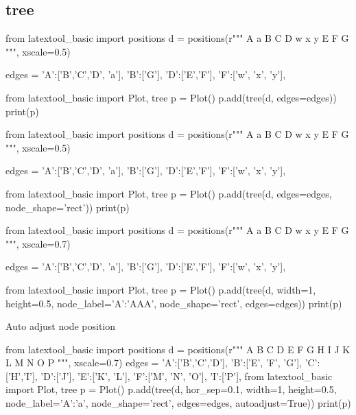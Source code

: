 \subsection{tree}

\begin{python}
from latextool_basic import positions
d = positions(r"""
  A   a 
B C D    w x y
    E F  
G
""", xscale=0.5)

edges = {'A':['B','C','D', 'a'],
         'B':['G'],
         'D':['E','F'],
         'F':['w', 'x', 'y'],
}

from latextool_basic import Plot, tree
p = Plot()
p.add(tree(d, edges=edges))
print(p)
\end{python}




\begin{python}
from latextool_basic import positions
d = positions(r"""
  A   a 
B C D    w x y
    E F  
G
""", xscale=0.5)

edges = {'A':['B','C','D', 'a'],
         'B':['G'],
         'D':['E','F'],
         'F':['w', 'x', 'y'],
}

from latextool_basic import Plot, tree
p = Plot()
p.add(tree(d, edges=edges, node_shape='rect'))
print(p)
\end{python}




\begin{python}
from latextool_basic import positions
d = positions(r"""
  A   a 
B C D    w x y
    E F  
G
""", xscale=0.7)

edges = {'A':['B','C','D', 'a'],
         'B':['G'],
         'D':['E','F'],
         'F':['w', 'x', 'y'],
}

from latextool_basic import Plot, tree
p = Plot()
p.add(tree(d,
           width=1, height=0.5, 
           node_label={'A':'AAA'},
           node_shape='rect',
           edges=edges))
print(p)
\end{python}







\newpage
Auto adjust node position
\begin{python}
from latextool_basic import positions
d = positions(r"""
      A   
  B   C   D
E F G H   I J  
K L M N O P
""", xscale=0.7)
edges = {'A':['B','C','D'], 'B':['E', 'F', 'G'],
         'C':['H','I'],     'D':['J'],
         'E':['K', 'L'],    'F':['M', 'N', 'O'],
         'I':['P'],
}
from latextool_basic import Plot, tree
p = Plot()
p.add(tree(d, hor_sep=0.1,
           width=1, height=0.5, 
           node_label={'A':'a'}, node_shape='rect',
           edges=edges,
           autoadjust=True))
print(p)
\end{python}


